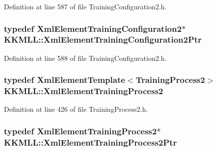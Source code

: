 Definition at line 587 of file Training\+Configuration2.\+h.

\subsubsection[{\texorpdfstring{Xml\+Element\+Training\+Configuration2\+Ptr}{XmlElementTrainingConfiguration2Ptr}}]{\setlength{\rightskip}{0pt plus 5cm}typedef {\bf Xml\+Element\+Training\+Configuration2}$\ast$ {\bf K\+K\+M\+L\+L\+::\+Xml\+Element\+Training\+Configuration2\+Ptr}}\hypertarget{namespace_k_k_m_l_l_a1602f508032f268ebda5c2c1d2840cfc}{}\label{namespace_k_k_m_l_l_a1602f508032f268ebda5c2c1d2840cfc}


Definition at line 588 of file Training\+Configuration2.\+h.

\subsubsection[{\texorpdfstring{Xml\+Element\+Training\+Process2}{XmlElementTrainingProcess2}}]{\setlength{\rightskip}{0pt plus 5cm}typedef {\bf Xml\+Element\+Template}$<${\bf Training\+Process2}$>$ {\bf K\+K\+M\+L\+L\+::\+Xml\+Element\+Training\+Process2}}\hypertarget{namespace_k_k_m_l_l_a2204408f06b7e47e27b81e52b929ea94}{}\label{namespace_k_k_m_l_l_a2204408f06b7e47e27b81e52b929ea94}


Definition at line 426 of file Training\+Process2.\+h.

\subsubsection[{\texorpdfstring{Xml\+Element\+Training\+Process2\+Ptr}{XmlElementTrainingProcess2Ptr}}]{\setlength{\rightskip}{0pt plus 5cm}typedef {\bf Xml\+Element\+Training\+Process2}$\ast$ {\bf K\+K\+M\+L\+L\+::\+Xml\+Element\+Training\+Process2\+Ptr}}\hypertarget{namespace_k_k_m_l_l_a06e10f206a9dcebf9f151ad6e3e6a3a9}{}\label{namespace_k_k_m_l_l_a06e10f206a9dcebf9f151ad6e3e6a3a9}


